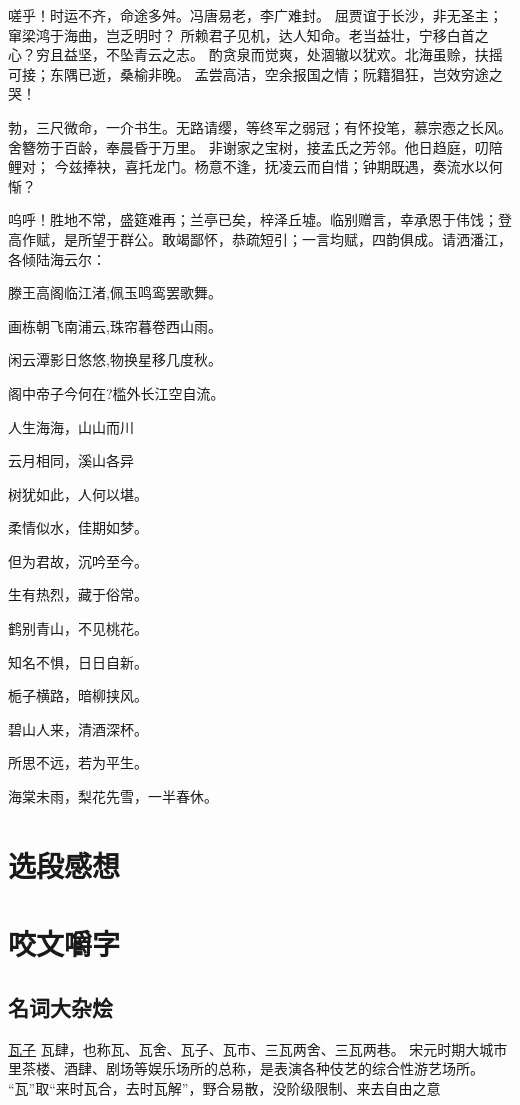 \documentclass[UTF8,oneside]{ctexbook}
\begin{document}
嗟乎！时运不齐，命途多舛。冯唐易老，李广难封。
屈贾谊于长沙，非无圣主；窜梁鸿于海曲，岂乏明时？
所赖君子见机，达人知命。老当益壮，宁移白首之心？穷且益坚，不坠青云之志。
酌贪泉而觉爽，处涸辙以犹欢。北海虽赊，扶摇可接；东隅已逝，桑榆非晚。
孟尝高洁，空余报国之情；阮籍猖狂，岂效穷途之哭！

勃，三尺微命，一介书生。无路请缨，等终军之弱冠；有怀投笔，慕宗悫之长风。
舍簪笏于百龄，奉晨昏于万里。
非谢家之宝树，接孟氏之芳邻。他日趋庭，叨陪鲤对；
今兹捧袂，喜托龙门。杨意不逢，抚凌云而自惜；钟期既遇，奏流水以何惭？

呜呼！胜地不常，盛筵难再；兰亭已矣，梓泽丘墟。临别赠言，幸承恩于伟饯；登高作赋，是所望于群公。敢竭鄙怀，恭疏短引；一言均赋，四韵俱成。请洒潘江，各倾陆海云尔：

\quad \quad 滕王高阁临江渚,佩玉鸣鸾罢歌舞。

\quad \quad 画栋朝飞南浦云,珠帘暮卷西山雨。

\quad \quad 闲云潭影日悠悠,物换星移几度秋。

\quad \quad 阁中帝子今何在?槛外长江空自流。

\mfApache \quad 人生海海，山山而川

\mfApache \quad 云月相同，溪山各异

\mfApache \quad 树犹如此，人何以堪。

\mfApache \quad 柔情似水，佳期如梦。

\mfApache \quad 但为君故，沉吟至今。

\mfApache \quad 生有热烈，藏于俗常。

\mfApache \quad 鹤别青山，不见桃花。

\mfApache \quad 知名不惧，日日自新。

\mfApache \quad 栀子横路，暗柳挟风。

\mfApache \quad 碧山人来，清酒深杯。

\mfApache \quad 所思不远，若为平生。

\mfApache \quad 海棠未雨，梨花先雪，一半春休。

\mfApache \quad 
\chapter{选段感想}

\chapter{咬文嚼字}
\section{名词大杂烩}
\mfApache \quad \underline{瓦子} \quad 瓦肆，也称瓦、瓦舍、瓦子、瓦市、三瓦两舍、三瓦两巷。
宋元时期大城市里茶楼、酒肆、剧场等娱乐场所的总称，是表演各种伎艺的综合性游艺场所。
“瓦”取“来时瓦合，去时瓦解”，野合易散，没阶级限制、来去自由之意
\end{document}
